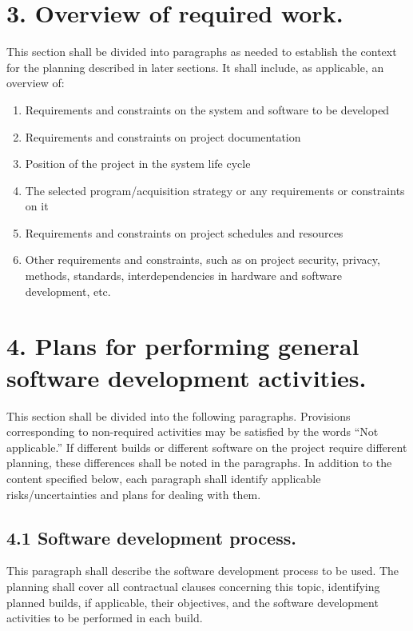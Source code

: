 \section{3. Overview of required work.}

This section shall be divided into paragraphs as needed to establish the
context for the planning described in later sections. It shall include,
as applicable, an overview of:

\begin{enumerate}
\itemsep1pt\parskip0pt
\item
  Requirements and constraints on the system and software to be
  developed
\item
  Requirements and constraints on project documentation
\item
  Position of the project in the system life cycle
\item
  The selected program/acquisition strategy or any requirements or
  constraints on it
\item
  Requirements and constraints on project schedules and resources
\item
  Other requirements and constraints, such as on project security,
  privacy, methods, standards, interdependencies in hardware and
  software development, etc.
\end{enumerate}

\section{4. Plans for performing general software development
activities.}

This section shall be divided into the following paragraphs. Provisions
corresponding to non-required activities may be satisfied by the words
``Not applicable.'' If different builds or different software on the
project require different planning, these differences shall be noted in
the paragraphs. In addition to the content specified below, each
paragraph shall identify applicable risks/uncertainties and plans for
dealing with them.

\subsection{4.1 Software development process.}

This paragraph shall describe the software development process to be
used. The planning shall cover all contractual clauses concerning this
topic, identifying planned builds, if applicable, their objectives, and
the software development activities to be performed in each build.


